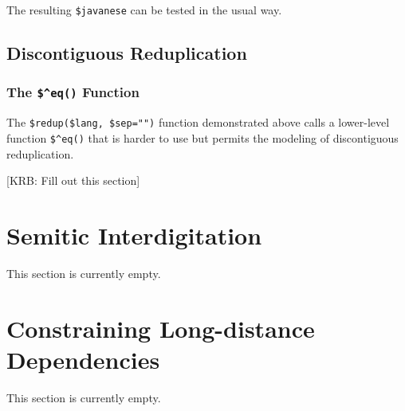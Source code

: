 \noindent
The resulting \verb!$javanese! \fst{} can be tested in the usual way.

\subsection{Discontiguous Reduplication}

\cprotect\subsubsection{The \verb!$^eq()! Function}

The \verb!$redup($lang, $sep="")! function demonstrated above calls a lower-level
function \verb!$^eq()! that is harder to use but permits the modeling of
discontiguous reduplication.

[KRB:  Fill out this section]


\section{Semitic Interdigitation}

This section is currently empty.

\section{Constraining Long-distance Dependencies}

This section is currently empty.
